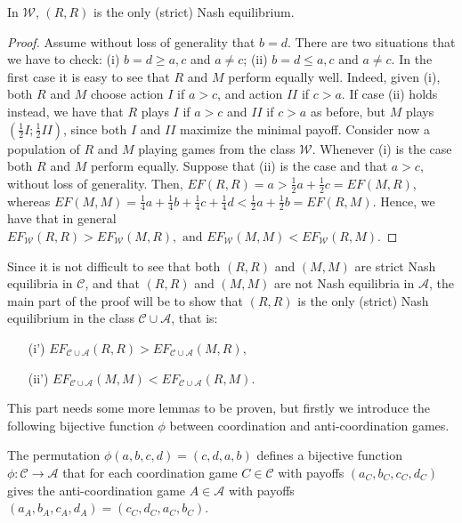 \documentclass[fleqn,reqno,11pt]{article}
\begin{document}
\medskip{}

\begin{lemma} \label{lemma:W games}
In $\mathcal{W}$, $(R,R)$ is the only (strict) Nash equilibrium.
\end{lemma}

\begin{proof}
Assume without loss of generality that $b=d$. There are two situations that we have to check: (i) $b=d \geq a,c$ and $ a \neq c $; (ii) $b=d \leq a,c$ and $ a \neq c $.
In the first case it
is easy to see that $R$ and $M$ perform equally well. Indeed, given
(i), both $R$ and $M$ choose action $I$ if $a>c$, and action $II$
if $c>a$. If case (ii) holds instead, we have that $R$ plays $I$
if $a>c$ and $II$ if $c>a$ as before, but $M$ plays $(\frac{1}{2}I;\frac{1}{2}II)$,
since both $I$ and $II$ maximize the minimal payoff. Consider now
a population of $R$ and $M$ playing games from the class $\mathcal{W}$.
Whenever (i) is the case both $R$ and $M$ perform equally. Suppose that
(ii) is the case and that $a>c$, without loss of generality. Then,  $EF(R,R)=a>\frac{1}{2}a+\frac{1}{2}c=EF(M,R)$, whereas $EF(M,M)=\frac{1}{4}a+\frac{1}{4}b+\frac{1}{4}c+\frac{1}{4}d<\frac{1}{2}a+\frac{1}{2}b=EF(R,M)$.
Hence, we have that in general $EF_{\mathcal{W}}(R,R)>EF_{\mathcal{W}}(M,R),\mbox{ and }EF_{\mathcal{W}}(M,M)<EF_{\mathcal{W}}(R,M)$.
\end{proof}

\medskip{}


Since it is not difficult to see that both $(R,R)$ and $(M,M)$ are strict Nash equilibria in $\mathcal{C}$, and that $(R,R)$ and $(M,M)$ are not Nash equilibria in $\mathcal{A}$, the main part of
the proof will be to show that $(R,R)$ is the only (strict) Nash equilibrium in the class $\mathcal{C}\cup\mathcal{A}$, that is:
\begin{itemize}
\item[(i')] $EF_{\mathcal{C}\cup\mathcal{A}}(R,R)>EF_{\mathcal{C}\cup\mathcal{A}}(M,R),$
\item[(ii')] $EF_{\mathcal{C}\cup\mathcal{A}}(M,M)<EF_{\mathcal{C}\cup\mathcal{A}}(R,M).$
\end{itemize}


\noindent This part needs some more lemmas to be proven, but firstly we introduce
the following bijective function $\phi$ between coordination and
anti-coordination games.

\medskip{}

\begin{definition}[$\phi$] \label{def:bijection phi}
The permutation $\phi(a,b,c,d)=(c,d,a,b)$ defines a bijective function $\phi:\mathcal{C}\rightarrow\mathcal{A}$ that for each
coordination game $C\in\mathcal{C}$ with payoffs $(a_{C},b_{C},c_{C},d_{C})$
gives the anti-coordination game $A\in\mathcal{A}$ with payoffs
$(a_{A},b_{A},c_{A},d_{A})=(c_{C},d_{C},a_{C},b_{C})$.
\end{definition}
\end{document}

